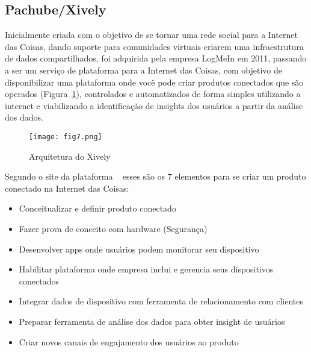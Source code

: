 
\subsection{Pachube/Xively}
	Inicialmente criada com o objetivo de se tornar uma rede social para a Internet das Coisas, dando suporte para comunidades virtuais criarem uma infraestrutura de dados compartilhados, foi adquirida pela empresa LogMeIn em 2011, passando a ser um servi\c{c}o de plataforma para a Internet das Coisas, com objetivo de disponibilizar uma plataforma onde voc\^e pode criar produtos conectados que s\~ao operados (Figura~\ref{fig:arqxively}), controlados e automatizados de forma simples utilizando a internet e viabilizando a identifica\c{c}\~ao de insights dos usu\'arios a partir da an\'alise dos dados.
	
	\begin{figure}[ht]
		\centering
		\texttt{[image: fig7.png]}
		\caption{Arquitetura do Xively}
		\label{fig:arqxively}
	\end{figure}
	
	
	Segundo o site da plataforma ~\cite{XIVELY} esses s\~ao os 7 elementos para se criar um produto conectado na Internet das Coisas:
	
	\begin{itemize}
		\item Conceitualizar e definir produto conectado
		\item Fazer prova de conceito com hardware (Seguran\c{c}a)
		\item Desenvolver apps onde usu\'arios podem monitorar seu dispositivo
		\item Habilitar plataforma onde empresa inclui e gerencia seus dispositivos conectados
		\item Integrar dados de dispositivo com ferramenta de relacionamento com clientes 
		\item Preparar ferramenta de an\'alise dos dados para obter insight de usu\'arios
		\item Criar novos canais de engajamento dos usu\'arios ao produto
	\end{itemize}
	
